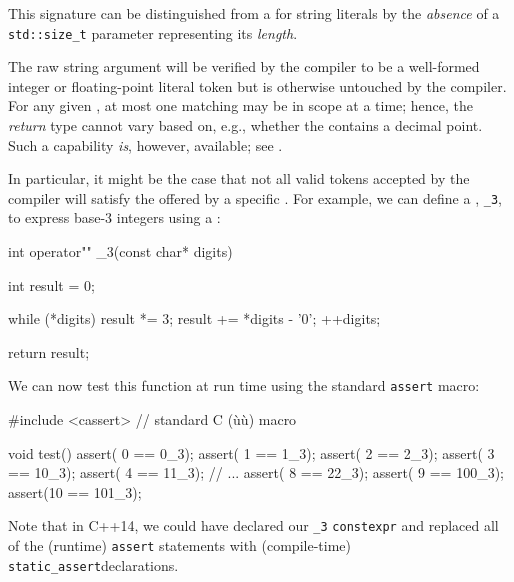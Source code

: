 \noindent This signature can be distinguished from a  for string literals by the \emph{absence} of a
\lstinline!std::size_t! parameter representing its \emph{length}.

The raw string argument will be verified by the compiler to be a
well-formed integer or floating-point literal token but is otherwise
untouched by the compiler. For any given , at most
one matching  may be in scope at a time; hence,
the \emph{return} type cannot vary based on, e.g., whether the
 contains a decimal point. Such a capability
\emph{is}, however, available; see .

In particular, it might be the case that not all valid tokens accepted
by the compiler will satisfy the  offered by a
specific . For example, we can define a , \lstinline!_3!, to express base-3 integers using a :

\begin{emcppslisting}[emcppsbatch=e11]
int operator"" _3(const char* digits)
{
    int result = 0;

    while (*digits)
    {
        result *= 3;
        result += *digits - '0';
        ++digits;
    }

    return result;
}
\end{emcppslisting}
    
\noindent We can now test this function at run time using the standard
\lstinline!assert! macro:

\begin{emcppslisting}[emcppsbatch=e11]
#include <cassert>  // standard C (ù{}ù) macro

void test()
{
    assert( 0 ==   0_3);
    assert( 1 ==   1_3);
    assert( 2 ==   2_3);
    assert( 3 ==  10_3);
    assert( 4 ==  11_3);
    // ...
    assert( 8 ==  22_3);
    assert( 9 == 100_3);
    assert(10 == 101_3);
}
\end{emcppslisting}
    
\noindent Note that in C++14, we could have declared our \lstinline!_3!  \lstinline!constexpr! and replaced all of the (runtime)
\lstinline!assert! statements with (compile-time) \lstinline!static_assert!\linebreak[4]%
\mbox{declarations}.

